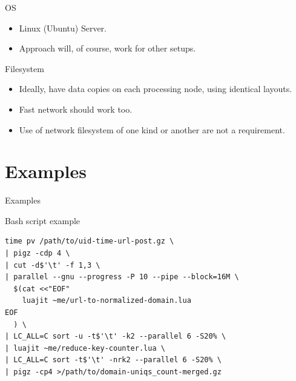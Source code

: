 \documentclass[handout]{beamer}
\begin{document}

\begin{frame}{OS}

\begin{itemize}
\item Linux (Ubuntu) Server.
\item Approach will, of course, work for other setups.
\end{itemize}

\end{frame}


\begin{frame}{Filesystem}

\begin{itemize}
\item Ideally, have data copies on each processing node, using identical
      layouts.
\item Fast network should work too.
\item Use of network filesystem of one kind or another are not a requirement.
\end{itemize}

\end{frame}


\section{Examples}


\begin{frame}
\huge Examples
\end{frame}


\begin{frame}[fragile]{Bash script example}

\begin{verbatim}
time pv /path/to/uid-time-url-post.gz \
| pigz -cdp 4 \
| cut -d$'\t' -f 1,3 \
| parallel --gnu --progress -P 10 --pipe --block=16M \
  $(cat <<"EOF"
    luajit ~me/url-to-normalized-domain.lua
EOF
  ) \
| LC_ALL=C sort -u -t$'\t' -k2 --parallel 6 -S20% \
| luajit ~me/reduce-key-counter.lua \
| LC_ALL=C sort -t$'\t' -nrk2 --parallel 6 -S20% \
| pigz -cp4 >/path/to/domain-uniqs_count-merged.gz
\end{verbatim}

\end{frame}
\end{document}
